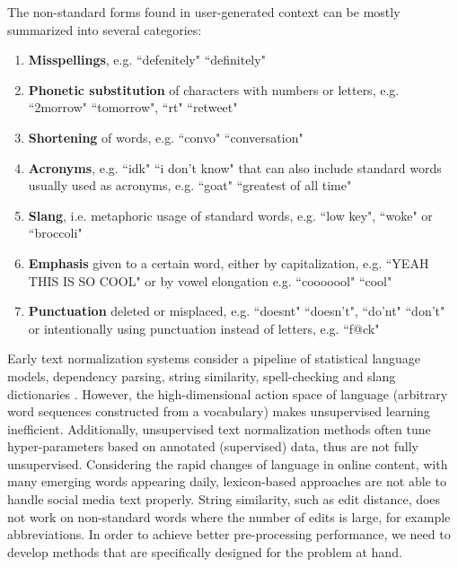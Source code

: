 \documentclass[letterpaper]{article} \usepackage{aaai19}  \usepackage{times}  \usepackage{helvet} \usepackage{courier}  \usepackage[hyphens]{url}  \usepackage{graphicx} \urlstyle{rm} \def\UrlFont{\rm}  \usepackage{graphicx}  \frenchspacing  \setlength{\pdfpagewidth}{8.5in}  \setlength{\pdfpageheight}{11in}
\newcommand{\citep}{\cite}
\begin{document}
The non-standard forms found in user-generated context can be mostly summarized into several categories:
\begin{enumerate}
    \item \textbf{Misspellings}, e.g. ``defenitely"  ``definitely"
    \item \textbf{Phonetic substitution} of characters with numbers or letters, e.g. ``2morrow"  ``tomorrow", ``rt"  ``retweet"
    \item \textbf{Shortening} of words, e.g. ``convo"  ``conversation" 
    \item \textbf{Acronyms}, e.g. ``idk"  ``i don't know" that can also include standard words usually used as acronyms, e.g. ``goat"  ``greatest of all time"
    \item \textbf{Slang}, i.e. metaphoric usage of standard words, e.g. ``low key", ``woke" or ``broccoli" 
    \item \textbf{Emphasis} given to a certain word, either by capitalization, e.g. ``YEAH THIS IS SO COOL" or by vowel elongation e.g. ``cooooool"   ``cool"
    \item \textbf{Punctuation} deleted or misplaced, e.g. ``doesnt"   ``doesn't", ``do'nt"   ``don't" or intentionally using punctuation instead of letters, e.g. ``f@ck"
\end{enumerate}


Early text normalization systems consider a pipeline of statistical language models, dependency parsing, string similarity, spell-checking and slang dictionaries \citep{liu2011insertion2011a,han2011lexical,han2013lexical}. However, the high-dimensional action space of language (arbitrary word sequences constructed from a vocabulary) makes unsupervised learning inefficient. 
Additionally, unsupervised text normalization methods often tune hyper-parameters based on annotated (supervised) data, thus are not fully unsupervised.
Considering the rapid changes of language in online content, with many emerging words appearing daily, lexicon-based approaches are not able to handle social media text properly. String similarity, such as edit distance, does not work on non-standard words where the number of edits is large, for example abbreviations. In order to achieve better pre-processing performance, we need to develop methods that are specifically designed for the problem at hand. 
\end{document}

